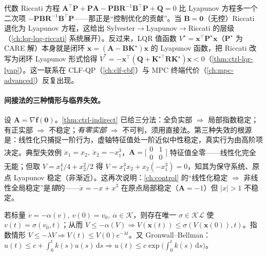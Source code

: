 \begin{insight}
代数 Riccati 方程 $\mathbf{A}^\top\mathbf{P}+\mathbf{P}\mathbf{A}-\mathbf{P}\mathbf{B}\mathbf{R}^{-1}\mathbf{B}^\top\mathbf{P}+\mathbf{Q}=0$ 比 Lyapunov 方程多一个二次项 $-\mathbf{P}\mathbf{B}\mathbf{R}^{-1}\mathbf{B}^\top\mathbf{P}$——那正是“控制优化的贡献”。当 $\mathbf{B}=\mathbf{0}$（无控）Riccati 退化为 Lyapunov 方程，这给出 Sylvester$\to$Lyapunov$\to$Riccati 的层级（\cref{ch:lqr-lqg-riccati} 系统展开）。反过来，LQR 值函数 $V^\star=\mathbf{x}^\top\mathbf{P}^\star\mathbf{x}$（$\mathbf{P}^\star$ 为 CARE 解）本身就是闭环 $\dot{\mathbf{x}}=(\mathbf{A}-\mathbf{B}\mathbf{K}^\star)\mathbf{x}$ 的 Lyapunov 函数，把 Riccati 改写为闭环 Lyapunov 形式恰得 $\dot V^\star=-\mathbf{x}^\top(\mathbf{Q}+\mathbf{K}^{\star\top}\mathbf{R}\mathbf{K}^\star)\mathbf{x}<0$（\cref{thm:ctrl-lqr-lyap}）。这一联系在 CLF-QP（\cref{ch:clf-cbf}）与 MPC 终端代价（\cref{ch:mpc-advanced}）反复出现。
\end{insight}

\paragraph{间接法的三种情形与临界失效。}
设 $\mathbf{A}=\nabla\mathbf{f}(\mathbf{0})$。\cref{thm:ctrl-indirect} 已给三分法：全负实部 $\Rightarrow$ 局部指数稳定；有正实部 $\Rightarrow$ 不稳定；\emph{有零实部} $\Rightarrow$ 不可判，须用直接法。第三种失效的根源是：线性化只捕捉一阶行为，虚轴特征值处一阶近似中性稳定，真实行为由高阶项决定。典型失效例 $\dot x_1=x_2,\ \dot x_2=-x_1^3$，$\mathbf{A}=\big[\begin{smallmatrix}0&1\\0&0\end{smallmatrix}\big]$ 特征值全零——线性化完全无能；但取 $V=x_1^4/4+x_2^2/2$ 得 $\dot V=x_1^3x_2+x_2(-x_1^3)=0$，知其为保守系统、原点 Lyapunov 稳定（非渐近）。这再次说明：\cref{ch:control} 的“线性化稳定 $\Rightarrow$ 非线性全局稳定”是\emph{错}的——$\dot x=-x+x^3$ 在原点局部稳定（$\mathbf{A}=-1$）但 $|x|>1$ 不稳定。

\begin{lemma}
\label{lem:lyap-comparison}
若标量 $\dot v=-\alpha(v),\ v(0)=v_0,\ \alpha\in\mathcal{K}$，则存在唯一 $\sigma\in\mathcal{KL}$ 使 $v(t)=\sigma(v_0,t)$；从而 $\dot V\le-\alpha(V)\Rightarrow V(\mathbf{x}(t))\le\sigma(V(\mathbf{x}(0)),t)$。指数情形 $\dot V\le-\lambda V\Rightarrow V(t)\le V(0)e^{-\lambda t}$。又 Gronwall–Bellman：$u(t)\le c+\int_0^t k(s)u(s)\,\mathrm ds\Rightarrow u(t)\le c\exp\!\big(\int_0^t k(s)\,\mathrm ds\big)$。
\end{lemma}

